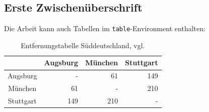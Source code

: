 \subsection{Erste Zwischenüberschrift}
\label{sec:ErsteZwischenueberschrift}
Die Arbeit kann auch Tabellen im \texttt{table}-Environment enthalten:
\begin{table}[ht]
  \centering
  \caption{Entfernungstabelle Süddeutschland, vgl. \cite{entfernungstabelle}}
  \begin{tabular}{c r r r}
    \toprule
              & Augsburg & München & Stuttgart \\
    \midrule
    Augsburg  & -        & 61      & 149       \\
    München   & 61       & -       & 210       \\
    Stuttgart & 149      & 210     & -         \\
    \bottomrule
  \end{tabular}
  \label{tab:entfernungen}
\end{table}


\printbibliography[heading=bibintoc]





